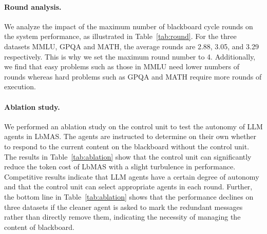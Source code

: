 \documentclass[11pt]{article}
\begin{document}
\paragraph{Round analysis.}
We analyze the impact of the maximum number of blackboard cycle rounds on the system performance, as illustrated in Table~\ref{tab:round}. For the three datasets MMLU, GPQA and MATH, the average rounds are 2.88, 3.05, and 3.29 respectively. This is why we set the maximum round number to 4. Additionally, we find that easy problems such as those in MMLU need lower numbers of rounds whereas hard problems such as GPQA and MATH require more rounds of execution.

\paragraph{Ablation study.}
We performed an ablation study on the control unit to test the autonomy of LLM agents in LbMAS. The agents are instructed to determine on their own whether to respond to the current content on the blackboard without the control unit. The results in Table~\ref{tab:ablation} show that the control unit can significantly reduce the token cost of LbMAS with a slight turbulence in performance. Competitive results indicate that LLM agents have a certain degree of autonomy and that the control unit can select appropriate agents in each round. Further, the bottom line in Table~\ref{tab:ablation} shows that the performance declines on three datasets if the cleaner agent is asked to mark the redundant messages rather than directly remove them, indicating the necessity of managing the content of blackboard.

\begin{table}[]
 \caption{Comparing the average execution rounds of the blackboard cycle and performances (in parentheses) under different maximum round settings. The best performances are highlighted in bold.}
  \centering
{}
  \label{tab:round}
\end{table}
\end{document}
